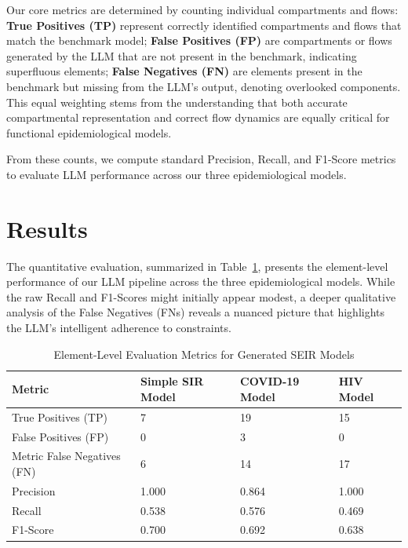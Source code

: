 \documentclass[conference]{IEEEtran}
\begin{document}
Our core metrics are determined by counting individual compartments and flows: \textbf{True Positives (TP)} represent correctly identified compartments and flows that match the benchmark model; \textbf{False Positives (FP)} are compartments or flows generated by the LLM that are not present in the benchmark, indicating superfluous elements; \textbf{False Negatives (FN)} are elements present in the benchmark but missing from the LLM's output, denoting overlooked components. This equal weighting stems from the understanding that both accurate compartmental representation and correct flow dynamics are equally critical for functional epidemiological models.

From these counts, we compute standard Precision, Recall, and F1-Score metrics to evaluate LLM performance across our three epidemiological models.

\section{Results}

The quantitative evaluation, summarized in Table~\ref{tab:element_metrics}, presents the element-level performance of our LLM pipeline across the three epidemiological models. While the raw Recall and F1-Scores might initially appear modest, a deeper qualitative analysis of the False Negatives (FNs) reveals a nuanced picture that highlights the LLM's intelligent adherence to constraints.

\begin{table}[h!]
\centering
\caption{Element-Level Evaluation Metrics for Generated SEIR Models}
\label{tab:element_metrics}
\begin{tabular}{|l|p{1.5cm}|p{1.5cm}|p{1.5cm}|}
\hline
\textbf{Metric} & \textbf{Simple SIR Model} & \textbf{COVID-19 Model} & \textbf{HIV Model} \\
\hline
True Positives (TP) & 7 & 19 & 15 \\
False Positives (FP) & 0 & 3 & 0 \\Metric
False Negatives (FN) & 6 & 14 & 17 \\
\hline
Precision & 1.000 & 0.864 & 1.000 \\
Recall & 0.538 & 0.576 & 0.469 \\
F1-Score & 0.700 & 0.692 & 0.638 \\
\hline
\end{tabular}
\end{table}
\end{document}

